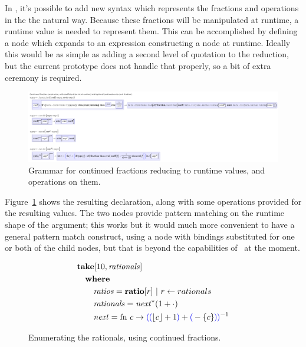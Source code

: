 In \Meta, it's possible to add new syntax which represents the fractions and operations in the the natural way. Because these fractions will be manipulated at runtime, a runtime value is needed to represent them. This can be accomplished by defining a  node which expands to an expression constructing a node at runtime. Ideally this would be as simple as adding a second level of quotation to the  reduction, but the current prototype does not handle that properly, so a bit of extra ceremony is required.

\begin{figure}[h]
  \begin{center}
    
  \includegraphics[scale=0.6]{src/image/continued-grammar.pdf}
  
  \end{center}
  \caption{Grammar for continued fractions reducing to runtime values, and operations on them.}
  \label{fig-cf}
\end{figure}

Figure~\ref{fig-cf} shows the resulting declaration, along with some operations provided for the resulting values. The two  nodes provide pattern matching on the runtime shape of the argument; this works but it would much more convenient to have a general pattern match construct, using a  node with bindings substituted for one or both of the child nodes, but that is beyond the capabilities of \Meta\ at the moment. 

\begin{figure}[h]
  \begin{center}
  
  \begin{align*}
  & \mathbf{take}[10, \mathit{rationals}]
  \\
  & \quad \mathbf{where}
  \\
  & \qquad \mathit{ratios} = \mathbf{ratio}[r] ~ | ~ r \leftarrow rationals
  \\
  & \qquad \mathit{rationals} = \mathit{next}^*(1 + \cdot)
  \\
  & \qquad \mathit{next} = \mathrm{fn} ~ c \to {\color{blue}\left(\!\right.} {\color{blue}\left(\!\right.} \lfloor c \rfloor + 1 {\color{blue}\left.\!\right)} + {\color{blue}\left(\!\right.} - \{c\} {\color{blue}\left.\!\right)} {\color{blue}\left.\!\right)}^{-1}
  \end{align*}
    
  
  \end{center}
  \caption{Enumerating the rationals, using continued fractions.}
  \label{fig-rationals}
\end{figure}


